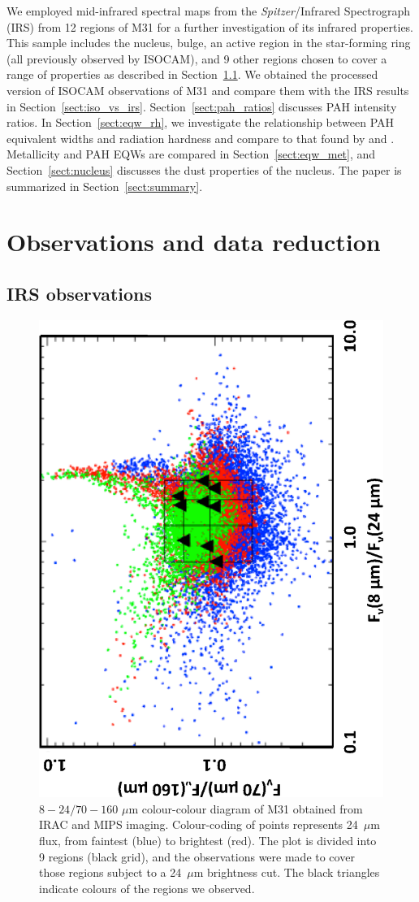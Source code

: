 \documentclass[useAMS,usenatbib,a4paper]{mn2e}
\begin{document}
We employed mid-infrared spectral maps from the {\em Spitzer}/Infrared Spectrograph (IRS) from 12 regions of M31 for a further investigation of 
its infrared properties. This sample includes the nucleus, bulge, an active region in the star-forming ring (all previously observed by ISOCAM), and 9 
other regions chosen to cover a range of properties as described in Section~\ref{sect:irs_obs}. 
We obtained the processed version of ISOCAM observations of M31 and compare them with the IRS results in Section~\ref{sect:iso_vs_irs}. 
Section~\ref{sect:pah_ratios} discusses PAH intensity ratios.
In Section~\ref{sect:eqw_rh}, we investigate the relationship between PAH equivalent widths and radiation 
hardness and compare to that found by \citet{Engelbracht_2008} and \citet{Gordon:2008lr}. Metallicity and PAH EQWs are compared in 
Section~\ref{sect:eqw_met}, and Section~\ref{sect:nucleus} discusses the dust properties of the nucleus. The paper is summarized in Section~\ref{sect:summary}.


\section{Observations and data reduction}

\subsection{IRS observations}
\label{sect:irs_obs}

\begin{figure}
\centering
\includegraphics[width = 6.5 cm,angle=270]{fig1.eps}
\caption{$8 - 24/70 - 160$ $\mu$m colour-colour diagram of M31 obtained from IRAC and MIPS imaging. Colour-coding of points represents
24~$\mu$m flux, from faintest (blue) to brightest (red). The plot is divided into 9 regions (black grid), and the observations were made to 
cover those regions subject to a 24~$\mu$m brightness cut. The black triangles indicate colours of the regions we observed.}
\label{colourmaps}
\end{figure}
\end{document}
